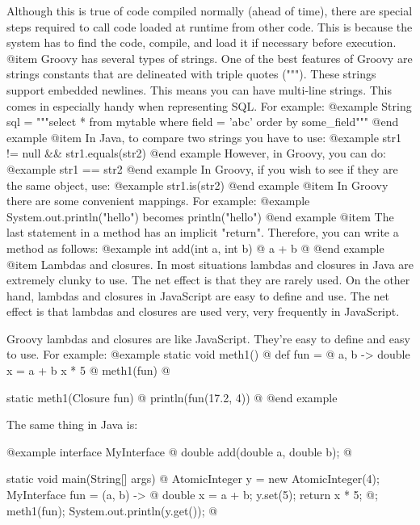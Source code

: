 Although this is true of code compiled normally (ahead of time),
there are special steps required to call code loaded at runtime
from other code.  This is because the system has to find the code,
compile, and load it if necessary before execution.
@item
Groovy has several types of strings.  One of the best features of
Groovy are strings constants that are delineated with triple quotes
(""").  These strings support embedded newlines.  This means you
can have multi-line strings.  This comes in especially handy when
representing SQL.  For example:
@example
       String sql = """select *
                       from mytable
                       where field = 'abc'
                       order by some_field"""
@end example
@item
In Java, to compare two strings you have to use:
@example
      str1 != null && str1.equals(str2)
@end example
   However, in Groovy, you can do:
@example
      str1 == str2
@end example
In Groovy, if you wish to see if they are the same object, use:
@example   
      str1.is(str2)
@end example
@item
In Groovy there are some convenient mappings.  For example:
@example
   System.out.println("hello") becomes println("hello")
@end example
@item
The last statement in a method has an implicit "return".  Therefore,
you can write a method as follows:
@example   
   int add(int a, int b) @{
       a + b
   @}
@end example
@item
Lambdas and closures.  In most situations lambdas and closures in
Java are extremely clunky to use.  The net effect is that they are
rarely used.  On the other hand, lambdas and closures in JavaScript
are easy to define and use.  The net effect is that lambdas and
closures are used very, very frequently in JavaScript.
   
Groovy lambdas and closures are like JavaScript.  They're easy to
define and easy to use.  For example:
@example   
       static void meth1() @{
            def fun = @{ a, b ->
                double x = a + b
                x * 5
            @}
            meth1(fun)
        @}

        static meth1(Closure fun) @{
            println(fun(17.2, 4))
        @}
@end example

The same thing in Java is:

@example
        interface MyInterface @{
            double add(double a, double b);
        @}

        static void main(String[] args) @{
            AtomicInteger y = new AtomicInteger(4);
            MyInterface fun = (a, b) -> @{
                double x = a + b;
                y.set(5);
                return x * 5;
            @};
            meth1(fun);
            System.out.println(y.get());
        @}


